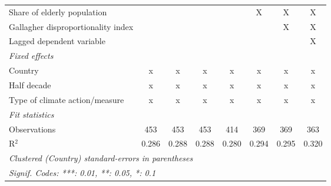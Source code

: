 \begin{tabular}{lccccccc}
   Share of elderly population                                                 &              &             &              &             & X             & X             & X\\  
   Gallagher disproportionality index                                          &              &             &              &             &               & X             & X\\  
   Lagged dependent variable                                                   &              &             &              &             &               &               & X\\  
   \emph{Fixed effects}\\
   Country                                                                     & x            & x           & x            & x           & x             & x             & x\\  
   Half decade                                                                 & x            & x           & x            & x           & x             & x             & x\\  
   Type of climate action/measure                                              & x            & x           & x            & x           & x             & x             & x\\  
   \midrule \emph{Fit statistics}\\
   Observations                                                                & 453          & 453         & 453          & 414         & 369           & 369           & 363\\  
   R$^2$                                                                       & 0.286        & 0.288       & 0.288        & 0.280       & 0.294         & 0.295         & 0.320\\  
   \midrule
   \multicolumn{8}{l}{\emph{Clustered (Country) standard-errors in parentheses}}\\
   \multicolumn{8}{l}{\emph{Signif. Codes: ***: 0.01, **: 0.05, *: 0.1}}\\
\end{tabular}
\par\endgroup


